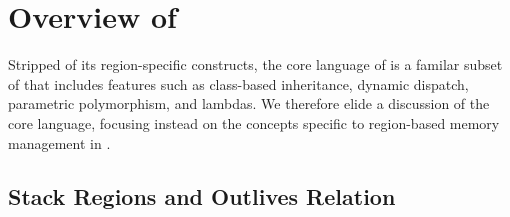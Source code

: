 \section{Overview of \name}
\label{sec:overview}

Stripped of its region-specific constructs, the core language of \name
is a familar subset of \csharp that includes features such as
class-based inheritance, dynamic dispatch, parametric polymorphism,
and lambdas.  We therefore elide a discussion of the core language,
focusing instead on the concepts specific to region-based memory
management in \name.

\subsection{Stack Regions and Outlives Relation}

